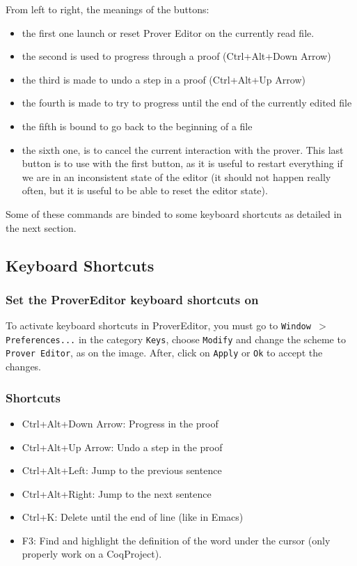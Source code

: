 \documentclass[a4paper]{article}
\begin{document}
From left to right, the meanings of the buttons: 
\begin{itemize}
\item the first one launch or reset Prover Editor on the currently read file. 

\item the second is used to progress through a proof
(Ctrl+Alt+Down Arrow)
\item the third is made to undo a step in a proof
(Ctrl+Alt+Up Arrow)
\item the fourth is made to try to progress until the end of the 
currently edited file
\item the fifth is bound to go back to the beginning of a file
\item the sixth one, is to cancel the current interaction with the 
prover. This last button is to use with the first button, as it is useful
to restart everything if we are in an inconsistent state of the editor
(it should not happen really often, but it is useful to be able to 
reset the editor state).
\end{itemize}
Some of these commands are binded to some keyboard shortcuts as detailed
in the next section.
\subsection{Keyboard Shortcuts}
\subsubsection{Set the ProverEditor keyboard shortcuts on}
To activate keyboard shortcuts in ProverEditor, you must go to
{\tt Window $>$ Preferences...} in the category {\tt Keys}, choose 
{\tt Modify} and change the scheme to {\tt Prover Editor}, as on the image. 
After, click on {\tt Apply} or {\tt Ok} to accept the changes.



\subsubsection{Shortcuts}
\begin{itemize}
\item Ctrl+Alt+Down Arrow: Progress in the proof
\item Ctrl+Alt+Up Arrow: Undo a step in the proof
\item Ctrl+Alt+Left: Jump to the previous sentence
\item Ctrl+Alt+Right: Jump to the next sentence
\item Ctrl+K: Delete until the end of line (like in Emacs)
\item F3: Find and highlight the definition of the word under the cursor
(only properly work on a CoqProject).
\end{itemize}
\end{document}
